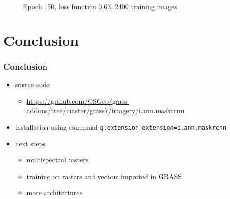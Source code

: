 \documentclass{beamer}
\begin{document}
\begin{frame}
\begin{figure}[ht]
{	\caption*{Epoch 150, loss function 0.63, 2400 training images}}
\end{figure}

\end{frame}


\section{Conclusion}

\begin{frame}[fragile]

\frametitle{Conclusion}

\begin{itemize}
	\item source code
	\begin{itemize}
		\item \url{https://github.com/OSGeo/grass-addons/tree/master/grass7/imagery/i.ann.maskrcnn}
	\end{itemize}
	\item installation using command \verb|g.extension extension=i.ann.maskrcnn|
	\item next steps
	\begin{itemize}
		\item multispectral rasters
		\item training on rasters and vectors imported in GRASS
		\item more architectures
	\end{itemize}
\end{itemize}

\end{frame}
\end{document}
